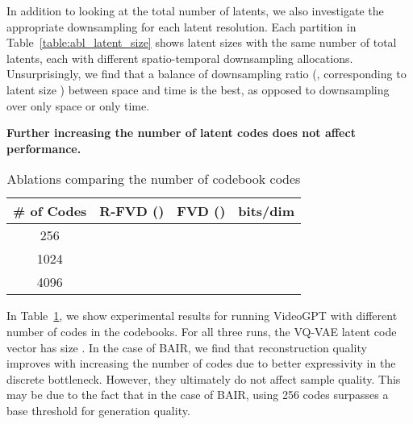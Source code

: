 In addition to looking at the total number of latents, we also investigate the appropriate downsampling for each latent resolution. Each partition in Table~\ref{table:abl_latent_size} shows latent sizes with the same number of total latents, each with different spatio-temporal downsampling allocations. Unsurprisingly, we find that a balance of downsampling ratio (, corresponding to latent size ) between space and time is the best, as opposed to downsampling over only space or only time. 

\textbf{Further increasing the number of latent codes does not affect performance.}
\begin{table}[H]
\begin{minipage}{.5\textwidth}
\centering
\caption{Ablations comparing the number of codebook codes}
\label{table:abl_n_codes}
\begin{tabular}{@{}cccc@{}}
\toprule
\# of Codes & R-FVD () & FVD () & bits/dim \\ \midrule
256         &                &     &       \\
1024        &                &     &       \\
4096        &                &     &       \\ \bottomrule
\end{tabular}
\end{minipage}
\end{table}
In Table~\ref{table:abl_n_codes}, we show experimental results for running VideoGPT with different number of codes in the codebooks. For all three runs, the VQ-VAE latent code vector has size . In the case of BAIR, we find that reconstruction quality improves with increasing the number of codes due to better expressivity in the discrete bottleneck. However, they ultimately do not affect sample quality. This may be due to the fact that in the case of BAIR, using 256 codes surpasses a base threshold for generation quality.

